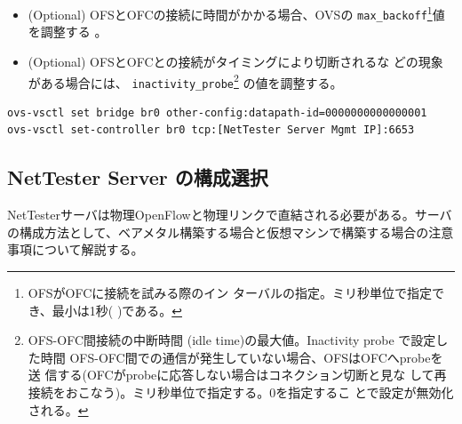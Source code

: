\begin{itemize}
\begin{itemize}
        \item (Optional) OFSとOFCの接続に時間がかかる場合、OVSの
              \verb|max_backoff|\footnote{OFSがOFCに接続を試みる際のイン
              ターバルの指定。ミリ秒単位で指定でき、最小は1秒(
              )である。}値を調整する
              \cite{ovs-backoff-doc}。
        \item (Optional) OFSとOFCとの接続がタイミングにより切断されるな
              どの現象がある場合には、
              \verb|inactivity_probe|\footnote{OFS-OFC間接続の中断時間
              (idle time)の最大値。Inactivity probe で設定した時間
              OFS-OFC間での通信が発生していない場合、OFSはOFCへprobeを送
              信する(OFCがprobeに応答しない場合はコネクション切断と見な
              して再接続をおこなう)。ミリ秒単位で指定する。0を指定するこ
              とで設定が無効化される。} の値を調整する。
       \end{itemize}
\end{itemize}

\begin{lstlisting}[language=sh,caption=物理スイッチのOpenFlow設定,label=lst:psw-openflow-config]
ovs-vsctl set bridge br0 other-config:datapath-id=0000000000000001
ovs-vsctl set-controller br0 tcp:[NetTester Server Mgmt IP]:6653
\end{lstlisting}

  \subsection{NetTester Server の構成選択}
  \label{sec:nettester-server-deploy-pattern}


NetTesterサーバは物理OpenFlowと物理リンクで直結される必要がある。サーバ
の構成方法として、ベアメタル構築する場合と仮想マシンで構築する場合の注意
事項について解説する。

